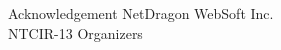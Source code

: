 \documentclass[final,hyperref={pdfpagelabels=false}]{beamer}
\begin{document}
\begin{frame}{}
\begin{columns}[t]
\begin{column}{.49\linewidth}
        \begin{block}{Acknowledgement}
          NetDragon WebSoft Inc. \\
          NTCIR-13 Organizers
        \end{block}

      \end{column}
    \end{columns}
  \end{frame}
\end{document}
